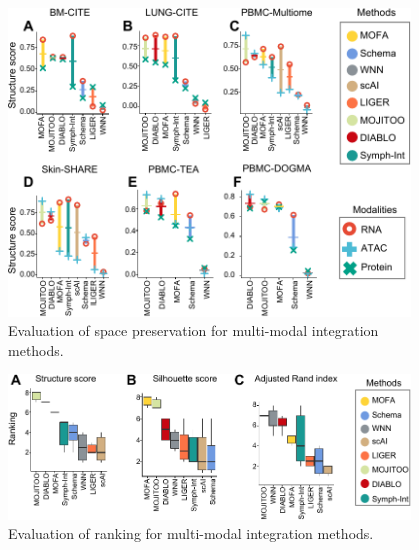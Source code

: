\begin{figure}[!ht]
	\centering
	\includegraphics[width=0.95\textwidth]{structure/fig}
	\vspace{0.1cm}
	\caption[Evaluation of space preservation for multi-modal integration methods.]{Evaluation of space preservation for multi-modal integration methods.}
	\label{fig:structure}
\end{figure}

\begin{figure}[!ht]
	\centering
	\includegraphics[width=0.95\textwidth]{ranking/fig}
	\vspace{0.1cm}
	\caption[Evaluation of ranking for multi-modal integration methods.]{Evaluation of ranking for multi-modal integration methods.}
	\label{fig:ranking}
\end{figure}


